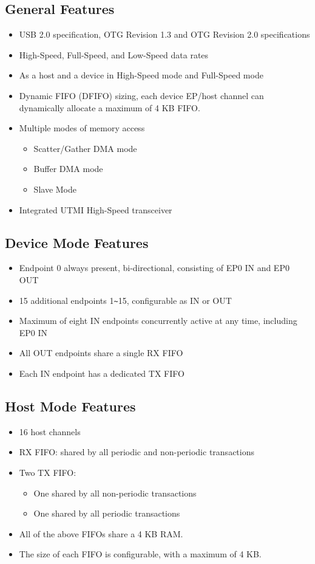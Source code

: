 \documentclass[main\_\_EN.tex]{subfiles}
\begin{document}
\subsection{General Features}
\begin{itemize}
    \item USB 2.0 specification, OTG Revision 1.3 and OTG Revision 2.0 specifications
    \item High-Speed, Full-Speed, and Low-Speed data rates
    \item As a host and a device in High-Speed mode and Full-Speed mode
    \item Dynamic FIFO (DFIFO) sizing, each device EP/host channel can dynamically allocate a maximum of 4 KB FIFO.
    \item Multiple modes of memory access
    \begin{itemize}
        \item Scatter/Gather DMA mode
        \item Buffer DMA mode
        \item Slave Mode
    \end{itemize}
    \item Integrated UTMI High-Speed transceiver
\end{itemize}

\subsection{Device Mode Features}
\begin{itemize}
\item Endpoint 0 always present, bi-directional, consisting of EP0 IN and EP0 OUT
\item 15 additional endpoints 1\verb+~+15, configurable as IN or OUT
\item Maximum of eight IN endpoints concurrently active at any time, including EP0 IN
\item All OUT endpoints share a single RX FIFO
\item Each IN endpoint has a dedicated TX FIFO
\end{itemize}

\subsection{Host Mode Features}
\begin{itemize}
    \item 16 host channels
    \item RX FIFO: shared by all periodic and non-periodic transactions
    \item Two TX FIFO:
    \begin{itemize}
        \item One shared by all non-periodic transactions
        \item One shared by all periodic transactions
    \end{itemize}
\item All of the above FIFOs share a 4 KB RAM.
\item The size of each FIFO is configurable, with a maximum of 4 KB.
\end{itemize}
\end{document}
